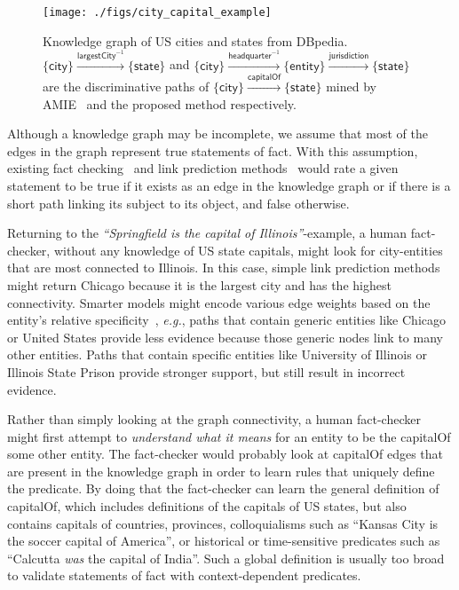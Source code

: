 \documentclass[reprint,twocolumn,showpacs,preprintnumbers,amsmath, aps,pre,amssymb]{revtex4-1}
\newcommand\eg{\emph{e.g.}}
\begin{document}
\begin{figure}[t]
\centering
\texttt{[image: ./figs/city\_capital\_example]}
\caption{Knowledge graph of US cities and states from DBpedia. $\{\textsf{city}\}\xrightarrow{\textsf{largestCity}^{-1}}\{\textsf{state}\}$ and $\{\textsf{city}\}\xrightarrow{\textsf{headquarter}^{-1}}\{\textsf{entity}\}\xrightarrow{\textsf{jurisdiction}}\{\textsf{state}\}$ are the discriminative paths of $\{\textsf{city}\}\xrightarrow{\textsf{capitalOf}}\{\textsf{state}\}$ mined by AMIE~\cite{Galarraga2013} and the proposed method respectively.}
\label{fig:city_capital_example}
\end{figure}

Although a knowledge graph may be incomplete, we assume that most of the edges in the graph represent true statements of fact. With this assumption, existing fact checking~\cite{Ciampaglia2015} and link prediction methods~\cite{Kleinberg2007,Adamic2003,Barabasi1999,Katz1953,Haveliwala2002} would rate a given statement to be true if it exists as an edge in the knowledge graph or if there is a short path linking its subject to its object, and false otherwise. 

Returning to the \textit{``Springfield is the capital of Illinois''}-example, a human fact-checker, without any knowledge of US state capitals, might look for city-entities that are most connected to \textsf{Illinois}. In this case, simple link prediction methods might return \textsf{Chicago} because it is the largest city and has the highest connectivity. Smarter models might encode various edge weights based on the entity's relative specificity~\cite{Adamic2003,Ciampaglia2015}, \eg, paths that contain generic entities like \textsf{Chicago} or \textsf{United States} provide less evidence because those generic nodes link to many other entities. Paths that contain specific entities like \textsf{University of Illinois} or \textsf{Illinois State Prison} provide stronger support, but still result in incorrect evidence.

Rather than simply looking at the graph connectivity, a human fact-checker might first attempt to \textit{understand what it means} for an entity to be the \textsf{capitalOf} some other entity. The fact-checker would probably look at \textsf{capitalOf} edges that are present in the knowledge graph in order to learn rules that uniquely define the predicate. By doing that the fact-checker can learn the general definition of \textsf{capitalOf}, which includes definitions of the capitals of US states, but also contains capitals of countries, provinces, colloquialisms such as ``Kansas City is the soccer capital of America'', or historical or time-sensitive predicates such as ``Calcutta \emph{was} the capital of India''. Such a global definition is usually too broad to validate statements of fact with context-dependent predicates.
\end{document}
